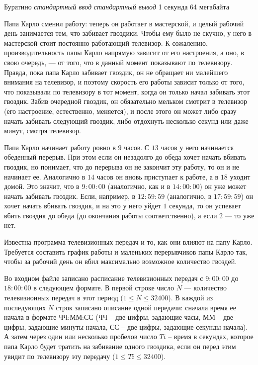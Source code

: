 \begin{problem}%
{Буратино}%
{\textsl{стандартный ввод}}%
{\textsl{стандартный вывод}}%
{1 секунда}%
{64 мегабайта}%
{}

Папа Карло сменил работу: теперь он работает в мастерской, и целый рабочий день занимается тем, что забивает гвоздики. Чтобы ему было не скучно, у него в мастерской стоит постоянно работающий телевизор. К сожалению, производительность папы Карло напрямую зависит от его настроения, а оно, в свою очередь, — от того, что в данный момент показывают по телевизору. Правда, пока папа Карло забивает гвоздик, он не обращает ни малейшего внимания на телевизор, и поэтому скорость его работы зависит только от того, что показывали по телевизору в тот момент, когда он только начал забивать этот гвоздик. Забив очередной гвоздик, он обязательно мельком смотрит в телевизор (его настроение, естественно, меняется), и после этого он может либо сразу начать забивать следующий гвоздик, либо отдохнуть несколько секунд или даже минут, смотря телевизор.

Папа Карло начинает работу ровно в $9$ часов. С $13$ часов у него начинается обеденный перерыв. При этом если он незадолго до обеда хочет начать вбивать гвоздик, но понимает, что до перерыва он не закончит эту работу, то он и не начинает ее. Аналогично в $14$ часов он вновь приступает к работе, а в $18$ уходит домой. Это значит, что в $9:00:00$ (аналогично, как и в $14:00:00$) он уже может начать забивать гвоздик. Если, например, в $12:59:59$ (аналогично, в $17:59:59$) он хочет начать вбивать гвоздик, и на это у него уйдет $1$ секунда, то он успевает вбить гвоздик до обеда (до окончания работы соответственно), а если $2$ — то уже нет.

Известна программа телевизионных передач и то, как они влияют на папу Карло. Требуется составить график работы и маленьких перерывчиков папы Карло так, чтобы за рабочий день он вбил максимально возможное количество гвоздей.

\InputFile

Во входном файле записано расписание телевизионных передач с $9:00:00$ до $18:00:00$ в следующем формате. В первой строке число $N$ — количество телевизионных передач в этот период ($1 \le N \le 32400$). В каждой из последующих $N$ строк записано описание одной передачи: сначала время ее начала в формате ЧЧ:ММ:СС (ЧЧ – две цифры, задающие часы, ММ – две цифры, задающие минуты начала, СС – две цифры, задающие секунды начала). А затем через один или несколько пробелов число $Ti$ – время в секундах, которое папа Карло будет тратить на забивание одного гвоздика, если он перед этим увидит по телевизору эту передачу ($1 \le Ti \le 32400$). \\


\end{problem}
